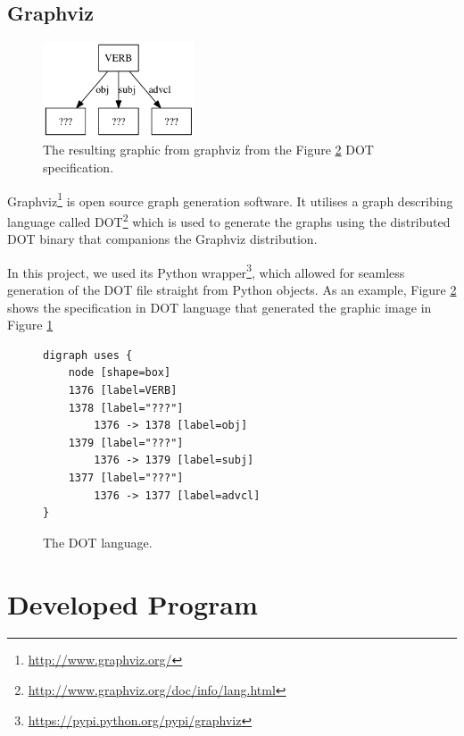 \documentclass[11pt,a4paper,openright]{memoir}
\begin{document}
\subsection{Graphviz}

\begin{figure}[!htbp]
  \centering
    \includegraphics[width=0.4\textwidth]{./images/command-simplified-group-uses-16}
  \caption[The resulting graphic from graphviz.]{The resulting graphic from graphviz from the Figure \ref{fig:dot_lang} DOT specification.}
  \label{fig:dot_img}
\end{figure}

Graphviz\footnote{\url{http://www.graphviz.org/}} is open source graph generation software. It utilises a graph describing language called DOT\footnote{\url{http://www.graphviz.org/doc/info/lang.html}} which is used to generate the graphs using the distributed DOT binary that companions the Graphviz distribution.

In this project, we used its Python wrapper\footnote{\url{https://pypi.python.org/pypi/graphviz}}, which allowed for seamless generation of the DOT file straight from Python objects. As an example, Figure \ref{fig:dot_lang} shows the specification in DOT language that generated the graphic image in Figure \ref{fig:dot_img}

\begin{figure}[!htbp]

\begin{verbatim}
digraph uses {
    node [shape=box]
    1376 [label=VERB]
    1378 [label="???"]
        1376 -> 1378 [label=obj]
    1379 [label="???"]
        1376 -> 1379 [label=subj]
    1377 [label="???"]
        1376 -> 1377 [label=advcl]
}
\end{verbatim}

  \caption[The DOT language.]{The DOT language.}
  \label{fig:dot_lang}
\end{figure}


%
%
%

\section{Developed Program}
\end{document}

